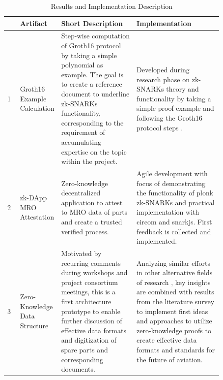 \setlength{\tabcolsep}{2ex}
\renewcommand{\arraystretch}{1.5}%
\begin{table}[htb]
	\centering
	    \caption{Results and Implementation Description}
		\begin{tabular}{|m{0.001\linewidth} | m{0.12\linewidth} | m{0.35\linewidth} | m{0.4\linewidth} |}
		\hline
		\textbf{}& \textbf{Artifact} & \textbf{Short Description} & \textbf{Implementation} \\ \hline
            1&Groth16 Example \newline Calculation & Step-wise computation of Groth16 protocol by taking a simple polynomial as example. The goal is to create a reference document to underline zk-SNARKs functionality, corresponding to the requirement of accumulating expertise on the topic within the project. & Developed during research phase on zk-SNARKs theory and functionality by taking a simple proof example and following the Groth16 protocol steps \citep{Groth2016OnTS}. \\  \hline
            2&zk-DApp MRO \newline Attestation & Zero-knowledge decentralized application to attest to MRO data of parts and create a trusted verified process. & Agile development with focus of demonstrating the functionality of plonk zk-SNARKs and practical implementation with circom and snarkjs. First feedback is collected and implemented. \\ \hline 
            3&Zero-Knowledge Data \newline Structure & Motivated by recurring comments during workshops and project consortium meetings, this is a first architecture prototype to enable further discussion of effective data formats and digitization of spare parts and corresponding documents. & Analyzing similar efforts in other alternative fields of research \citep{sedlemeirgrenenergy}, key insights are combined with results from the literature survey to implement first ideas and approaches to utilize zero-knowledge proofs to create effective data formats and standards for the future of aviation. \\  \hline 
	\end{tabular}
\label{tab:summary_artifacts}
\end{table}

